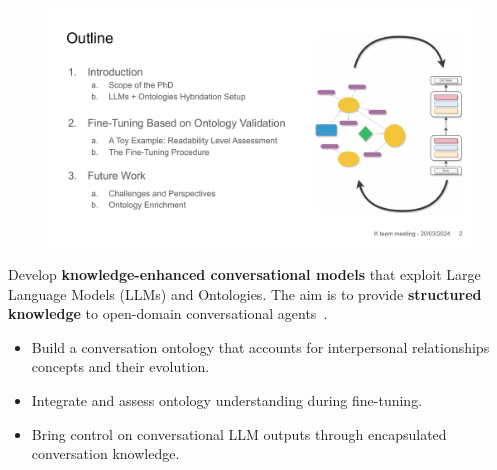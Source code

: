 \documentclass[a0paper,portrait]{baposter}
\begin{document}
\begin{poster}
{\begin{figure}
    \vspace{-15pt}
    \begin{center}
        \includegraphics[width=\linewidth]{general-idea.pdf}
    \end{center}
\end{figure}
\vspace*{0.1em}
Develop \textbf{knowledge-enhanced conversational models} that exploit Large Language Models (LLMs) and Ontologies. The aim is to provide \textbf{structured knowledge} to open-domain conversational agents~\cite{varshney-first:2023}.

\begin{itemize}
    \item Build a conversation ontology that accounts for interpersonal relationships concepts and their evolution.
    \item Integrate and assess ontology understanding during ﬁne-tuning.
    \item Bring control on conversational LLM outputs through encapsulated conversation knowledge.
\end{itemize}
\vspace*{0.3em}
}


\end{poster}
\end{document}
